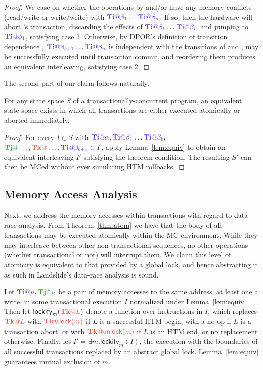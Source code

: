 \documentclass{article}
\begin{document}
\begin{proof}
	We case on whether the operations by \tjj and/or \tkk have any memory conflicts (read/write or write/write)
	with $\tiiat{\beta_1}\dots\tiiat{\beta_n}$.
	If so, then the hardware will abort \tii's transaction, discarding the effects of $\tiiat{\beta_1}\dots\tiiat{\beta_n}$
	and jumping to $\tiiat{\phi_1}$,
	satisfying case 1.
	Otherwise, by DPOR's definition of transition dependence \cite{dpor}, %
	$\tiiat{\beta_{b+1}}\dots\tiiat{\beta_n}$ is independent with the transitions of \tjj and \tkk,
	may be successfully executed until transaction commit,
	and reordering them produces an equivalent interleaving,
	satisfying case 2.
\end{proof}

The second part of our claim follows naturally.

\begin{theorem}
	\label{thm:atom}
	For any state space $S$ of a transactionally-concurrent program,
	an equivalent state space exists in which all transactions are either executed atomically or aborted immediately.
\end{theorem}

\begin{proof}
	For every $I \in S$ with $\tiiat{\alpha},\tiiat{\beta_1}\dots\tiiat{\beta_b},$ $\tjjat{\dots},\tkkat{\dots},\tiiat{\beta_{b+1}} \in I$,
	apply Lemma~\ref{lem:equiv} to obtain an equivalent interleaving $I'$ satisfying the theorem condition.
	The resulting $S'$ can then be MCed without ever simulating HTM rollbacks.
\end{proof}

\subsection{Memory Access Analysis}

Next, we address the memory accesses within transactions with regard to data-race analysis.
From Theorem~\ref{thm:atom} we have that the body of all transactions may be executed atomically within the MC environment.
While they may interleave between other non-transactional sequences,
no other operations (whether transactional or not) will interrupt them.
We claim this level of atomicity is equivalent to that provided by a global lock,
and hence abstracting it as such in Landslide's data-race analysis is sound.

Let $\tiiat{\mu},\tjjat{\nu}$ be a pair of memory accesses to the same address, at least one a write,
in some transactional execution $I$ normalized under Lemma~\ref{lem:equiv}.
Then let $\mathsf{lockify}_m(\tkkat{L})$ denote a function over instructions in $I$,
which replaces $\tkkat{L}$ with $\tkkat{\mathsf{lock}(m)}$ if $L$ is a successful HTM begin,
with a no-op if $L$ is a transaction abort,
or with $\tkkat{\mathsf{unlock}(m)}$ if $L$ is an HTM end,
or no replacement otherwise.
Finally, let $I' = \exists m. \mathsf{lockify}_m(I)$,
the execution with the boundaries of all successful transactions replaced by an abstract global lock.
Lemma~\ref{lem:equiv} guarantees mutual exclusion of $m$.
\end{document}
